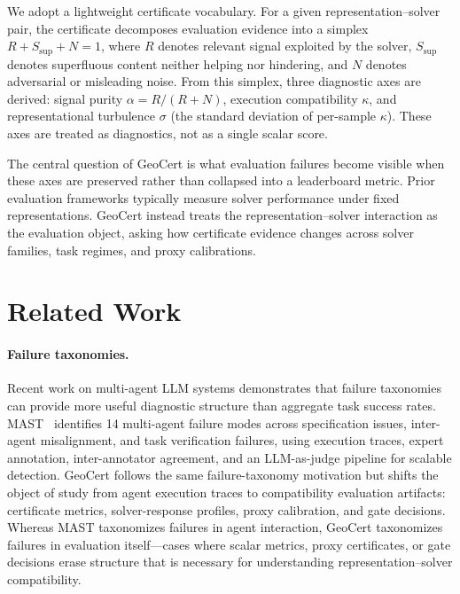 \documentclass{article}
\begin{document}
We adopt a lightweight certificate vocabulary. For a given representation--solver pair, the certificate decomposes evaluation evidence into a simplex $R + S_{\text{sup}} + N = 1$, where $R$ denotes relevant signal exploited by the solver, $S_{\text{sup}}$ denotes superfluous content neither helping nor hindering, and $N$ denotes adversarial or misleading noise. From this simplex, three diagnostic axes are derived: signal purity $\alpha = R/(R+N)$, execution compatibility $\kappa$, and representational turbulence $\sigma$ (the standard deviation of per-sample $\kappa$). These axes are treated as diagnostics, not as a single scalar score.

The central question of GeoCert is what evaluation failures become visible when these axes are preserved rather than collapsed into a leaderboard metric. Prior evaluation frameworks typically measure solver performance under fixed representations. GeoCert instead treats the representation--solver interaction as the evaluation object, asking how certificate evidence changes across solver families, task regimes, and proxy calibrations.

\section{Related Work}

\paragraph{Failure taxonomies.} Recent work on multi-agent LLM systems demonstrates that failure taxonomies can provide more useful diagnostic structure than aggregate task success rates. MAST~\cite{mast2025} identifies 14 multi-agent failure modes across specification issues, inter-agent misalignment, and task verification failures, using execution traces, expert annotation, inter-annotator agreement, and an LLM-as-judge pipeline for scalable detection. GeoCert follows the same failure-taxonomy motivation but shifts the object of study from agent execution traces to compatibility evaluation artifacts: certificate metrics, solver-response profiles, proxy calibration, and gate decisions. Whereas MAST taxonomizes failures in agent interaction, GeoCert taxonomizes failures in evaluation itself---cases where scalar metrics, proxy certificates, or gate decisions erase structure that is necessary for understanding representation--solver compatibility.
\end{document}
